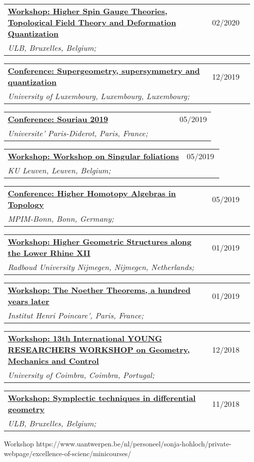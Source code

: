 \documentclass[a4paper]{article}
\newcommand{\longvoice}[8]{
    \begin{tabular}{p{0.83\linewidth} p{0.17\linewidth} }
        \textbf{\href{#3}{#2: #1}} & #4 
        \\ 
        \textit{#5, #6, #7;} & {\small\emph{#8}}
    \end{tabular}
    \vspace{.5em}
}
\begin{document}
        {}
    \longvoice{Higher Spin Gauge Theories, Topological Field Theory and Deformation Quantization}
        {Workshop}
        {http://www.solvayinstitutes.be/event/workshop/higher_spin_2020/higher_spin_2020.html}
        {02/2020}
        {ULB}
        {Bruxelles}
        {Belgium}
        {}
    \longvoice{Supergeometry, supersymmetry and quantization}
        {Conference}
        {http://math.uni.lu/SuperWork/SuperConference.html}
        {12/2019}
        {University of Luxembourg}
        {Luxembourg}
        {Luxembourg}
        {}
    \longvoice{Souriau 2019}
        {Conference}
        {https://web.archive.org/web/20190831102558/http://souriau2019.fr/?page_id=2}
        {05/2019}
        {Universite' Paris-Diderot}
        {Paris}
        {France}
        {}
    \longvoice{Workshop on Singular foliations}
        {Workshop}
        {https://wis.kuleuven.be/agenda/sem-geometry/sem-geometry-upcoming}
        {05/2019}
        {KU Leuven}
        {Leuven}
        {Belgium}
        {}
    \longvoice{Higher Homotopy Algebras in Topology}
        {Conference}
        {https://web.archive.org/web/20190831103619/https://www.mpim-bonn.mpg.de/node/9245}
        {05/2019}
        {MPIM-Bonn}
        {Bonn}
        {Germany}
        {}
    \longvoice{Higher Geometric Structures along the Lower Rhine XII}
        {Workshop}
        {https://web.archive.org/web/20190831103524/https://www.math.ru.nl/~sagave/higher-structures-XII/}
        {01/2019}
        {Radboud University Nijmegen}
        {Nijmegen}
        {Netherlands}
        {}
    \longvoice{The Noether Theorems, a hundred years later}
        {Workshop}
        {https://web.archive.org/web/20190831105634/http://noether.iecl.univ-lorraine.fr/noether_en.html}
        {01/2019}
        {Institut Henri Poincare'}
        {Paris}
        {France}
        {}
    \longvoice{13th International YOUNG RESEARCHERS WORKSHOP on Geometry, Mechanics and Control}
        {Workshop}
        {https://web.archive.org/web/20190831103121/http://www.uc.pt/en/congressos/13yrw/programa}
        {12/2018}
        {University of Coimbra}
        {Coimbra}
        {Portugal}
        {}
    \longvoice{Symplectic techniques in differential geometry}
        {Workshop}
        {https://www.uantwerpen.be/nl/personeel/sonja-hohloch/private-webpage/excellence-of-scienc/minicourses/}
        {11/2018}
        {ULB}
        {Bruxelles}
        {Belgium}
        {}
        {Workshop}
        {https://www.uantwerpen.be/nl/personeel/sonja-hohloch/private-webpage/excellence-of-scienc/minicourses/}
\end{document}
